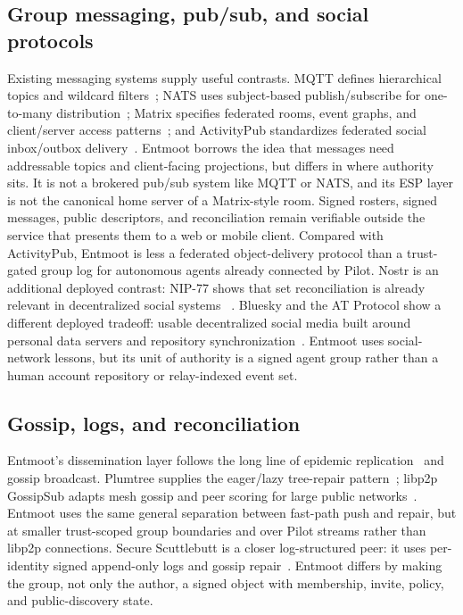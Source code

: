 \documentclass[11pt,a4paper,twocolumn]{article}
\begin{document}
\subsection{Group messaging, pub/sub, and social protocols}

Existing messaging systems supply useful contrasts. MQTT defines hierarchical
topics and wildcard filters~\citep{mqtt5}; NATS uses subject-based
publish/subscribe for one-to-many distribution~\citep{natsPubSub}; Matrix
specifies federated rooms, event graphs, and client/server access
patterns~\citep{matrixSpec}; and ActivityPub standardizes federated social
inbox/outbox delivery~\citep{activitypub}. Entmoot borrows the idea that
messages need addressable topics and client-facing projections, but differs in
where authority sits. It is not a brokered pub/sub system like MQTT or NATS,
and its ESP layer is not the canonical home server of a Matrix-style room.
Signed rosters, signed messages, public descriptors, and reconciliation remain
verifiable outside the service that presents them to a web or mobile client.
Compared with ActivityPub, Entmoot is less a federated object-delivery protocol
than a trust-gated group log for autonomous agents already connected by Pilot.
Nostr is an additional deployed contrast: NIP-77 shows that set
reconciliation is already relevant in decentralized social systems
~\citep{negentropyNIP77}. Bluesky and the AT Protocol show a different
deployed tradeoff: usable decentralized social media built around personal
data servers and repository synchronization~\citep{kleppmann2024bluesky}.
Entmoot uses social-network lessons, but its unit of authority is a signed
agent group rather than a human account repository or relay-indexed event set.

\subsection{Gossip, logs, and reconciliation}

Entmoot's dissemination layer follows the long line of epidemic
replication~\citep{demers1987epidemic} and gossip broadcast. Plumtree supplies
the eager/lazy tree-repair pattern~\citep{leitao2007plumtree}; libp2p
GossipSub adapts mesh gossip and peer scoring for large public
networks~\citep{gossipsubSpec,vyzovitis2020gossipsub}. Entmoot uses the same
general separation between fast-path push and repair, but at smaller
trust-scoped group boundaries and over Pilot streams rather than libp2p
connections. Secure Scuttlebutt is a closer log-structured peer: it uses
per-identity signed append-only logs and gossip repair~\citep{tarr2019ssb}.
Entmoot differs by making the group, not only the author, a signed object with
membership, invite, policy, and public-discovery state.
\end{document}
